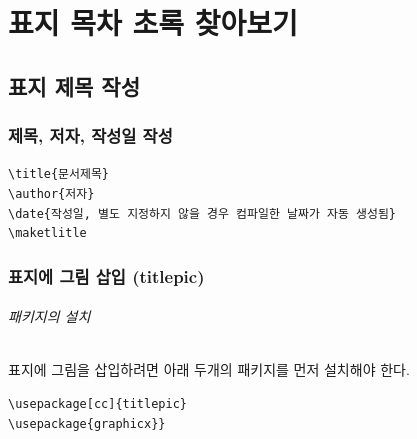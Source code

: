 \documentclass[12pt, a4paper, oneside]{book}
\let\stdsection\section
\renewcommand\section{\newpage\stdsection}
\begin{document}
	\part{표지 목차 초록 찾아보기 }
	
			\parttoc




	\chapter{표지 제목 작성}

		\minitoc				%
		\doublespace



	\newpage  \null
	\section{제목, 저자, 작성일 작성}
		
		\begin{framed}
		\verb|\title{문서제목}| \\
		\verb|\author{저자}| \\
		\verb|\date{작성일, 별도 지정하지 않을 경우 컴파일한 날짜가 자동 생성됨}| \\
		\verb|\maketlitle|
		\end{framed}
	
	
	
	
	
	\newpage  \null
	\section{표지에 그림 삽입 (titlepic)}
	
		\paragraph{패키지의 설치}
			표지에 그림을 삽입하려면 아래 두개의 패키지를 먼저 설치해야 한다.
			\begin{framed}
			\verb|\usepackage[cc]{titlepic}| \\
			\verb|\usepackage{graphicx}}|
			\end{framed}
	
\end{document}
